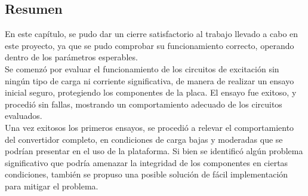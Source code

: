 \subsection{Resumen}

En este capítulo, se pudo dar un cierre satisfactorio al trabajo llevado a cabo en este proyecto, ya que se pudo comprobar su funcionamiento correcto, operando dentro de los parámetros esperables.\\

Se comenzó por evaluar el funcionamiento de los circuitos de excitación sin ningún tipo de carga ni corriente significativa, de manera de realizar un ensayo inicial seguro, protegiendo los componentes de la placa. El ensayo fue exitoso, y procedió sin fallas, mostrando un comportamiento adecuado de los circuitos evaluados.\\

Una vez exitosos los primeros ensayos, se procedió a relevar el comportamiento del convertidor completo, en condiciones de carga bajas y moderadas que se podrían presentar en el uso de la plataforma. Si bien se identificó algún problema significativo que podría amenazar la integridad de los componentes en ciertas condiciones, también se propuso una posible solución de fácil implementación para mitigar el problema.\\